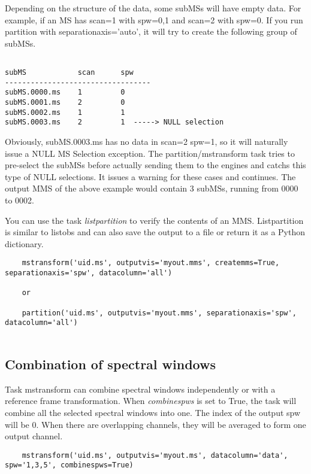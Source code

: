 Depending on the structure of the data, some subMSs will have empty data.
For example, if an MS has scan=1 with spw=0,1 and scan=2 with spw=0. If
you run partition with separationaxis='auto', it will try to create the
following group of subMSs.

\begin{verbatim}

subMS            scan      spw
----------------------------------
subMS.0000.ms    1         0
subMS.0001.ms    2         0
subMS.0002.ms    1         1
subMS.0003.ms    2         1  -----> NULL selection

\end{verbatim}

Obviously, subMS.0003.ms has no data in scan=2 spw=1, so it will naturally
issue a NULL MS Selection exception. The partition/mstransform task tries to
pre-select the subMSs before actually sending them to the engines and catchs 
this type of NULL selections. It issues a warning for these cases and continues.
The output MMS of the above example would contain 3 subMSs, running from 0000
to 0002.

You can use the task {\it listpartition} to verify the contents of an MMS.
Listpartition is similar to listobs and can also save the output to a file
or return it as a Python dictionary.

\begin{verbatim}
    mstransform('uid.ms', outputvis='myout.mms', createmms=True, separationaxis='spw', datacolumn='all')
    
    or
    
    partition('uid.ms', outputvis='myout.mms', separationaxis='spw', datacolumn='all')
    
\end{verbatim}

\subsection{Combination of spectral windows}
Task mstransform can combine spectral windows independently or
with a reference frame transformation. When {\it combinespws} is set to True, the task will
combine all the selected spectral windows into one. The index of the output spw
will be 0. When there are overlapping channels, they will be averaged to form one
output channel.

\begin{verbatim}
    mstransform('uid.ms', outputvis='myout.ms', datacolumn='data', spw='1,3,5', combinespws=True)
\end{verbatim}

